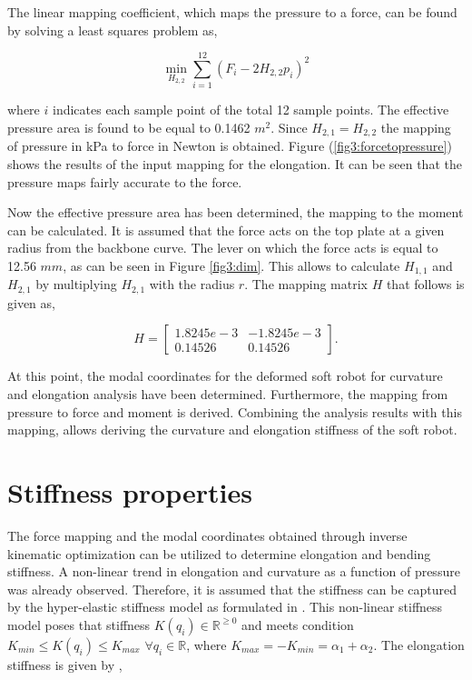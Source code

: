 The linear mapping coefficient, which maps the pressure to a force, can be found by solving a least squares problem as,

\begin{equation}
\min_{H_{2,2}} \sum_{i=1}^{12} (F_i - 2 H_{2,2} p_i)^2
\label{eq3:forcefitting}
\end{equation}

where $i$ indicates each sample point of the total 12 sample points. The effective pressure area is found to be equal to 0.1462 $m^2$. Since $H_{2,1} = H_{2,2}$ the mapping of pressure in kPa to force in Newton is obtained. Figure (\ref{fig3:forcetopressure}) shows the results of the input mapping for the elongation. It can be seen that the pressure maps fairly accurate to the force.

Now the effective pressure area has been determined, the mapping to the moment can be calculated. It is assumed that the force acts on the top plate at a given radius from the backbone curve. The lever on which the force acts is equal to 12.56 $mm$, as can be seen in Figure \ref{fig3:dim}. This allows to calculate $H_{1,1}$ and $H_{2,1}$ by multiplying $H_{2,1}$ with the radius $r$. The mapping matrix $H$ that follows is given as,

\begin{equation}
    H =  \begin{bmatrix} 1.8245e-3 & -1.8245e-3 \\
    0.14526 & 0.14526\end{bmatrix}.  
\end{equation}

At this point, the modal coordinates for the deformed soft robot for curvature and elongation analysis have been determined. Furthermore, the mapping from pressure to force and moment is derived. Combining the analysis results with this mapping, allows deriving the curvature and elongation stiffness of the soft robot. 




\section{Stiffness properties}

The force mapping and the modal coordinates obtained through inverse kinematic optimization can be utilized to determine elongation and bending stiffness. A non-linear trend in elongation and curvature as a function of pressure was already observed. Therefore, it is assumed that the stiffness can be captured by the hyper-elastic stiffness model as formulated in \cite{Caasenbrood2020StiffnessModel}. This non-linear stiffness model poses that stiffness $K(q_i) \in \mathbb{R}^{\geq 0}$ and meets condition $K_{min} \leq K(q_i) \leq K_{max} \hspace{4pt} \forall q_i \in \mathbb{R}$, where $K_{max} = -K_{min} = \alpha_1 + \alpha_2$. The elongation stiffness is given by \cite{Caasenbrood2020StiffnessModel},

